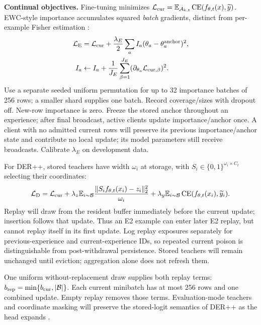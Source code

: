 \documentclass[10pt,a4paper]{article}
\newcommand{\CE}{\operatorname{CE}}
\begin{document}
\textbf{Continual objectives.} Fine-tuning minimizes $\mathcal L_{\rm cur}=\mathbb E_{\mathcal A_{k,t}}\CE(f_{\theta,t}(x),\widetilde y)$. EWC-style importance accumulates squared \emph{batch} gradients, distinct from per-example Fisher estimation \cite{ewc}:
\begin{equation}
\begin{aligned}
\mathcal L_{\rm E}&=\mathcal L_{\rm cur}+\frac{\lambda_E}{2}\sum_aI_a(\theta_a-\theta_a^{\rm anchor})^2,\\
I_a&\leftarrow I_a+\frac1{J_E}\sum_{\beta=1}^{J_E}(\partial_{\theta_a}\mathcal L_{{\rm cur},\beta})^2.
\end{aligned}
\label{eq:ewc}
\end{equation}
Use a separate seeded uniform permutation for up to 32 importance batches of 256 rows; a smaller shard supplies one batch. Record coverage/sizes with dropout off. New-row importance is zero. Freeze the stored anchor throughout an experience; after final broadcast, active clients update importance/anchor once. A client with no admitted current rows will preserve its previous importance/anchor state and contribute no local update; its model parameters still receive broadcasts. Calibrate $\lambda_E$ on development data.

For DER++, stored teachers have width $\omega_i$ at storage, with $S_i\in\{0,1\}^{\omega_i\times C_t}$ selecting their coordinates:
\begin{equation}
\mathcal L_{\rm D}=\mathcal L_{\rm cur}
+\lambda_z\mathbb E_{i\sim\mathcal B}\frac{\|S_if_{\theta,t}(x_i)-z_i\|_2^2}{\omega_i}
+\lambda_y\mathbb E_{i\sim\mathcal B}\CE(f_{\theta,t}(x_i),\widetilde y_i).
\label{eq:der}
\end{equation}
Replay will draw from the resident buffer immediately before the current update; insertion follows that update. Thus an E2 example can enter later E2 replay, but cannot replay itself in its first update. Log replay exposures separately for previous-experience and current-experience IDs, so repeated current poison is distinguishable from post-withdrawal persistence. Stored teachers will remain unchanged until eviction; aggregation alone does not refresh them.

One uniform without-replacement draw supplies both replay terms: $b_{\rm rep}=\min\{b_{\rm cur},|\mathcal B|\}$. Each current minibatch has at most 256 rows and one combined update. Empty replay removes those terms. Evaluation-mode teachers and coordinate masking will preserve the stored-logit semantics of DER++ as the head expands \cite{der}.
\end{document}
